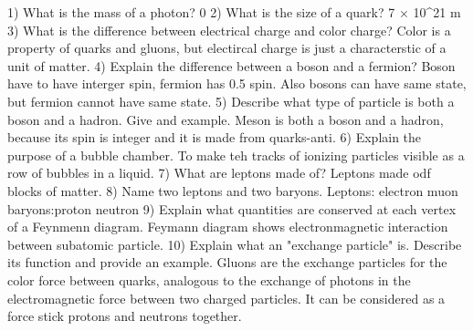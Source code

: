 1) What is the mass of a photon?
0
2) What is the size of a quark?
7 × 10^21 m
3) What is the difference between electrical charge and color charge?
Color is a property of quarks and gluons, but electircal charge is just a characterstic of a unit of matter.
4) Explain the difference between a boson and a fermion?
Boson have to have interger spin, fermion has 0.5 spin. Also bosons can have same state, but fermion cannot have same state.
5) Describe what type of particle is both a boson and a hadron.  Give and example.
Meson is both a boson and a hadron, because its spin is integer and it is made from quarks-anti.
6) Explain the purpose of a bubble chamber.
To make teh tracks of ionizing particles visible as a row of bubbles in a liquid.
7) What are leptons made of?
Leptons made odf blocks of matter.
8) Name two leptons and two baryons.
Leptons: electron muon
baryons:proton neutron
9) Explain what quantities are conserved at each vertex of a Feynmenn diagram.
Feymann diagram shows electronmagnetic interaction between subatomic particle.
10) Explain what an "exchange particle" is.  Describe its function and provide an example.
Gluons are the exchange particles for the color force between quarks, analogous to the exchange of photons in the electromagnetic 
force between two charged particles. It can be considered as a force stick protons and neutrons together. 
